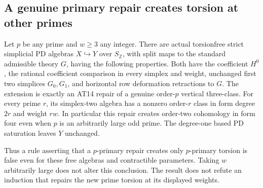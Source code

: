 \subsection{A genuine primary repair creates torsion at other primes}

\begin{proposition}
\label{AT23}
Let $p$ be any prime and $w\geq3$ any integer.
There are actual torsionfree strict simplicial PD algebras
$X\hookrightarrow Y$ over $S_{\mathbb Z}$, with split
maps to the standard admissible theory $G$, having the
following properties.
Both have the coefficient $H^0$, the rational coefficient
comparison in every simplex and weight, unchanged first
two simplices $G_0,G_1$, and horizontal row deformation
retractions to $G$.
The extension is exactly an AT14 repair of a genuine
order-$p$ vertical three-class.
For every prime $r$, its simplex-two algebra has a
nonzero order-$r$ class in form degree $2r$ and weight
$rw$. In particular this repair creates order-two
cohomology in form four even when $p$ is an arbitrarily
large odd prime.
The degree-one based PD saturation leaves $Y$ unchanged.

Thus a rule asserting that a $p$-primary repair creates
only $p$-primary torsion is false even for these free
algebras and contractible parameters.
Taking $w$ arbitrarily large does not alter this conclusion.
The result does not refute an induction that repairs
the new prime torsion at its displayed weights.
\end{proposition}

